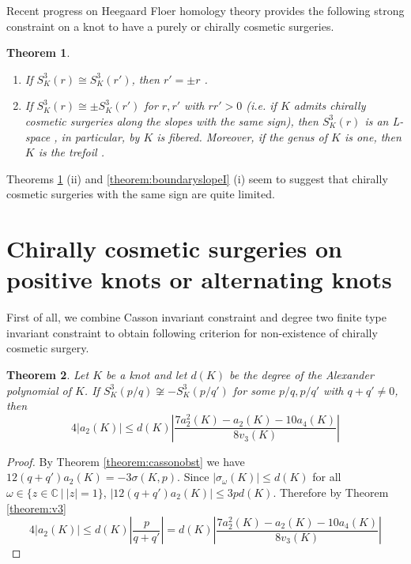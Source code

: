 \documentclass{amsart}
\newtheorem{theorem}{Theorem}[section]
\theoremstyle{remark}
\theoremstyle{definition}
\begin{document}
Recent progress on Heegaard Floer homology theory provides the following strong constraint on  a knot to have a purely or chirally cosmetic surgeries. 

\begin{theorem}
\label{theorem:HFK}
{$ $}
\begin{enumerate}
\item[(i)] If $S^{3}_{K}(r) \cong S^{3}_{K}(r')$, then $r'=\pm r$ \cite{NiWu} .
\item[(ii)] If $S^{3}_{K}(r) \cong \pm S^{3}_{K}(r')$ for $r,r'$ with $ r r'>0$ (i.e. if $K$ admits chirally cosmetic surgeries along the slopes with the same sign), then $S^{3}_{K}(r)$ is an L-space  \cite[Theorem 1.6]{OzsvathSzabo11}, in particular, by \cite{Ni} $K$ is fibered. 
Moreover, if the genus of $K$ is one, then $K$ is the trefoil \cite{WangJiajun}. 
\end{enumerate}
\end{theorem}

Theorems \ref{theorem:HFK} (ii) and \ref{theorem:boundaryslopeI} (i) seem to suggest that chirally cosmetic surgeries with the same sign are quite limited.










\section{Chirally cosmetic surgeries on positive knots or alternating knots}
\label{section:application}


First of all, we combine Casson invariant constraint and degree two finite type invariant constraint to obtain following criterion for non-existence of chirally cosmetic surgery.


\begin{theorem}
\label{theorem:criterion}
Let $K$ be a knot and let $d(K)$ be the degree of the Alexander polynomial of $K$. If $S^{3}_{K}(p\slash q) \not\cong -S^{3}_{K}(p\slash q')$ for some $p/q,p/q'$ with $q+q'\neq 0$, then 
\[ 4|a_2(K)| \leq d(K) \left| \frac{7a_2^{2}(K)-a_2(K)-10a_4(K)}{8v_3(K)} \right|\]
\end{theorem}
\begin{proof}
By Theorem \ref{theorem:cassonobst} we have $12(q+q')a_2(K)=-3\sigma(K,p)$.
Since $|\sigma_{\omega}(K)| \leq d(K)$ for all $\omega \in \{ z \in \mathbb{C}\: | \: |z|=1\}$,
 $|12(q+q')a_2(K)| \leq 3p d(K)$. Therefore by Theorem \ref{theorem:v3}
\[ 4|a_2(K)| \leq d(K) \left| \frac{p}{q+q'}\right| = d(K) \left| \frac{7a_2^{2}(K)-a_2(K)-10a_4(K)}{8v_3(K)} \right| \]
\end{proof}
\end{document}
